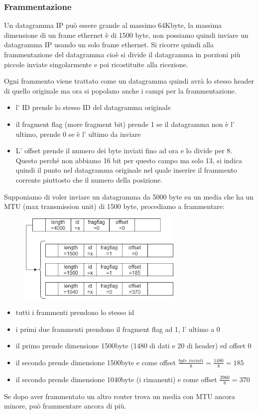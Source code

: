 \subsubsection{Frammentazione}
Un datagramma IP può essere grande al massimo 64Kbyte, la massima dimensione di un frame ethernet è di 1500 byte, non possiamo quindi inviare un datagramma IP usando un solo frame ethernet.
Si ricorre quindi alla frammentazione del datagramma cioè si divide il datagramma in porzioni più piccole inviate singolarmente e poi ricostituite alla ricezione.

Ogni frammento viene trattato come un datagramma quindi avrà lo stesso header di quello originale ma ora si popolano anche i campi per la frammentazione.
\begin{itemize}
    \item l' ID prende lo stesso ID del datagramma originale
    \item il fragment flag (more fragment bit) prende 1 se il datagramma non è l' ultimo, prende 0 se è l' ultimo da inviare
    \item L' offset prende il numero dei byte inviati fino ad ora e lo divide per 8. Questo perché non abbiamo 16 bit per questo campo ma solo 13, si indica quindi il punto nel datagramma originale nel quale inserire il frammento corrente piuttosto che il numero della posizione.
\end{itemize}

Supponiamo di voler inviare un datagramma da 5000 byte su un media che ha un MTU (max transmission unit) di 1500 byte, procediamo a frammentare:
\begin{figure}[H]
    \centering
    \includegraphics[width=300px]{images/5_Internetworking/fragmentation_example.png}
\end{figure}
\begin{itemize}
    \item tutti i frammenti prendono lo stesso id
    \item i primi due frammenti prendono il fragment flag ad 1, l' ultimo a 0
    \item il primo prende dimensione 1500byte (1480 di dati e 20 di header) ed offset 0
    \item il secondo prende dimensione 1500byte e come offset $\frac{byte\_inviati}{8} = \frac{1480}{8} = 185$
    \item il secondo prende dimensione 1040byte (i rimanenti) e come offset $\frac{2960}{8} = 370$
\end{itemize}
Se dopo aver frammentato un altro router trova un media con MTU ancora minore, può frammentare ancora di più.

